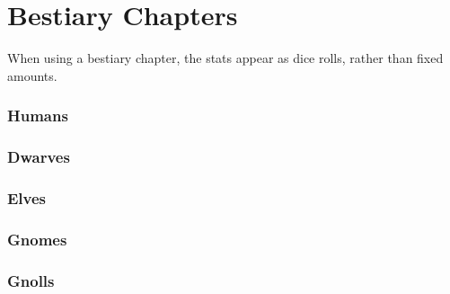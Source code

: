 \documentclass[a4paper,openany]{book}
\begin{document}
\chapter{Bestiary Chapters}

\begin{multicols}{2}


When using a bestiary chapter, the stats appear as dice rolls, rather than fixed amounts.

\subsection{Humans}

\humanfarmer

\humansoldier

\royalguard

\humandiplomat

\humanbard

\humanthief

\humanalchemist

\humanalchemist

\necromancer

\subsection{Dwarves}

\dwarvensoldier

\dwarventrader

\dwarvenrunemaster

\subsection{Elves}

\elf

\elf

\elvenenchanter

\hag

\subsection{Gnomes}

\gnome

\gnomishillusionist

\subsection{Gnolls}

\gnollhunter

\gnollshaman

\gnollshaman

\end{multicols}
\end{document}
